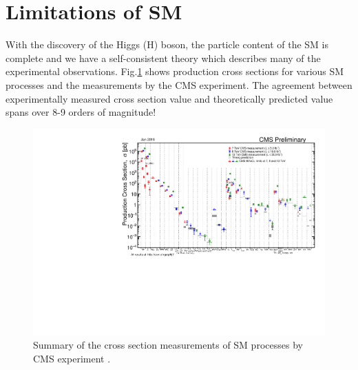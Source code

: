 \section{Limitations of SM}
\label{SMLimitations}
With the discovery of the Higgs (H) boson, the particle content of the SM is complete and we have a self-consistent theory
which describes many of the experimental observations. Fig.\ref{fig:SigmaNew_v0} shows production cross sections for 
various SM processes and the measurements by the CMS experiment. The agreement between experimentally measured cross section 
value and theoretically predicted value spans over 8-9 orders of magnitude!
\begin{figure}[h]
\centering
\includegraphics[width=0.9\linewidth]{../Figures/Chap1/SigmaNew_v0}
\caption[SM cross section measurements by CMS]{Summary of the cross section measurements of SM processes by CMS experiment \cite{SMxsec}.}
\label{fig:SigmaNew_v0}
\end{figure}

